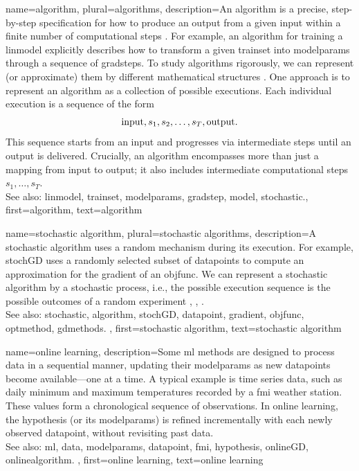 {name={algorithm}, plural={algorithms},
 	description={An algorithm is a precise, step-by-step specification for 
  		how to produce an output from a given input within a finite number of computational steps \cite{Cormen:2022aa}. 
    		For example, an algorithm for training a \gls{linmodel} explicitly describes how to 
		transform a given \gls{trainset} into \gls{modelparams} through a sequence of \glspl{gradstep}. 
    		To study algorithms rigorously, we can represent (or approximate) them by different mathematical structures \cite{Sipser2013}. 
     		One approach is to represent an algorithm as a collection of possible executions. Each individual 
     		execution is a sequence of the form $${\rm input},s_1,s_2,\ldots,s_T,{\rm output}.$$ This sequence 
     		starts from an input and progresses via intermediate steps until an output is delivered. Crucially, an algorithm 
     		encompasses more than just a mapping from input to output; it also includes intermediate computational 
     		steps $s_1,\ldots,s_T$.
				\\ 
		See also: \gls{linmodel}, \gls{trainset}, \gls{modelparams}, \gls{gradstep}, \gls{model}, \gls{stochastic}.},
	first={algorithm},
	text={algorithm} 
}

{name={stochastic algorithm}, 
 plural={stochastic algorithms},
	description={A \gls{stochastic} \gls{algorithm} uses a random mechanism 
		during its execution. For example, \gls{stochGD} uses a randomly selected subset of \glspl{datapoint} 
		to compute an approximation for the \gls{gradient} of an \gls{objfunc}. We can represent a 
		\gls{stochastic} \gls{algorithm} by a \gls{stochastic} process, i.e., the possible execution sequence is the possible outcomes of 
		a random experiment \cite{BertsekasProb}, \cite{RandomizedAlgos}, \cite{Gallager13}.		
		\\ 
		See also: \gls{stochastic}, \gls{algorithm}, \gls{stochGD}, \gls{datapoint}, \gls{gradient}, \gls{objfunc}, \gls{optmethod}, \gls{gdmethods}. },
	first={stochastic algorithm},
	text={stochastic algorithm} 
}

{name={online learning},
	description={Some \gls{ml} methods  are designed to process \gls{data} in a sequential 
		manner, updating their \gls{modelparams} as new \glspl{datapoint} become available—one at a time. 
		A typical example is time series data, such as daily \gls{minimum} and \gls{maximum} temperatures 
		recorded by a \gls{fmi} weather station. These values form a chronological sequence 
		of observations. In online learning, the \gls{hypothesis} (or its \gls{modelparams}) is refined 
		incrementally with each newly observed \gls{datapoint}, without revisiting past \gls{data}.  
		\\ 
		See also: \gls{ml}, \gls{data}, \gls{modelparams}, \gls{datapoint}, \gls{fmi}, \gls{hypothesis}, \gls{onlineGD}, \gls{onlinealgorithm}. },
	first={online learning},
	text={online learning} 
}

